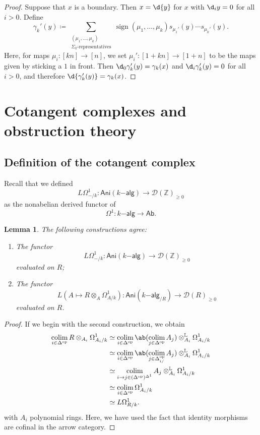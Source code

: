 \documentclass[10pt, oneside]{memoir}
\newtheorem{lem}[thm]{Lemma}
\theoremstyle{definition}
\theoremstyle{remark}
\theoremstyle{plain}
\theoremstyle{definition}
\theoremstyle{remark}
\newcommand{\Z}{\mathbb{Z}}
\renewcommand{\L}{\mathbb{L}}
\newcommand{\mc}[1]{\mathcal{#1}}
\newcommand{\on}[1]{\operatorname{#1}}
\newcommand{\ms}[1]{\mathsf{#1}}
\newcommand{\1}{\mathbf{1}}
\newcommand{\2}{\mathbf{2}}
\newcommand{\3}{\mathbf{3}}
\DeclareMathOperator{\op}{op}
\DeclareMathOperator*{\colim}{colim}
\begin{document}
\begin{proof}
    Suppose that \(x \) is a boundary. Then \(x = \d{y} \) for \(x \) with \(\d_i y = 0 \) for all \(i > 0 \). Define
    \[
        \gamma_k'(y) \coloneqq \sum_{\substack{(\mu_1, \ldots, \mu_k) \\ \Sigma_k \text{-representatives}}} \on{sign}(\mu_1, \ldots, \mu_k) s_{\mu_1'}(y) \cdots s_{\mu_k'}(y).
    \]
    Here, for maps \(\mu_i \colon [kn] \to [n] \), we set \(\mu_i' \colon [1+kn] \to [1+n] \) to be the maps given by sticking a \(1 \) in front. Then \(\d_0 \gamma_k'(y) = \gamma_k(x) \) and \(\d_i \gamma_k'(y) = 0 \) for all \(i > 0 \), and therefore \(\d{\gamma_k'(y)} = \gamma_k(x) \).
\end{proof}

\section{Cotangent complexes and obstruction theory}%
\label{sec:Cotangent complexes}

\subsection{Definition of the cotangent complex}%
\label{sub:Definition of the cotangent complex}

Recall that we defined
\[ L \Omega^1_{-/k} \colon \ms{Ani}(k\ms{-alg}) \to \mc{D}(\Z)_{\geq 0} \] as the nonabelian derived functor of
\[ \Omega^1 \colon k\ms{-alg} \to \ms{Ab}. \]

\begin{lem}
    The following constructions agree:
    \begin{enumerate}
        \item The functor 
        \[ L \Omega^1_{-/k} \colon \ms{Ani}(k\ms{-alg}) \to \mc{D}(\Z)_{\geq 0} \] evaluated on \(R \);
        \item The functor 
        \[ L (A \mapsto R \otimes_A \Omega^1_{A/k}) \colon \ms{Ani}(k\ms{-alg}_{/R}) \to \mc{D}(R)_{\geq 0} \]
        evaluated on \(R \).
    \end{enumerate}
\end{lem}

\begin{proof}
    If we begin with the second construction, we obtain
    \begin{align*}
        \colim_{i \in \Delta^{\op}} R \otimes_{A_i}\Omega^1_{A_i/k} &\simeq \colim_{i \in \Delta^{\op}} \ab(\colim_{j \in \Delta^{\op}} A_j) \otimes^{\L}_{A_i} \Omega^1_{A_i/k} \\
        &\simeq \colim_{i \in \Delta^{\op}} \ab(\colim_{j \in \Delta^{\op}_{i/}} A_j) \otimes_{A_i}^{\L} \Omega^1_{A_i/k} \\
        &\simeq \colim_{i \to j \in (\Delta^{\op})^{\Delta^1}} A_j \otimes_{A_i}^{\L} \Omega^1_{A_i/k} \\
        &\simeq \colim_{i \in \Delta^{\op}} \Omega^1_{A_i/k} \\
        &\simeq L \Omega^1_{R/k}.
    \end{align*}
    with \(A_i \) polynomial rings. Here, we have used the fact that identity morphisms are cofinal in the arrow category.
\end{proof}
\end{document}
